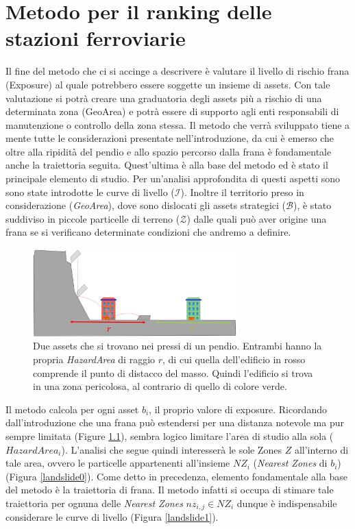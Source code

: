 
\chapter{Metodo per il ranking delle stazioni ferroviarie} %

\label{ch:mathtest} %

Il fine del metodo che ci si accinge a descrivere è valutare il livello di rischio frana (Exposure) al quale potrebbero essere soggette un insieme di assets. Con tale valutazione si potrà creare una graduatoria degli assets più a rischio di una determinata zona (GeoArea) e potrà essere di supporto agli enti responsabili di manutenzione o controllo della zona stessa. Il metodo che verrà sviluppato tiene a mente tutte le considerazioni presentate nell'introduzione, da cui è emerso che oltre alla ripidità del pendio e allo spazio percorso dalla frana è fondamentale anche la traiettoria seguita. Quest'ultima è alla base del metodo ed è stato il principale elemento di studio. Per un'analisi approfondita di questi aspetti sono sono state introdotte le curve di livello ($\mathcal{I}$). Inoltre il territorio preso in considerazione (\textit{GeoArea}), dove sono dislocati gli assets strategici ($\mathcal{B}$), è stato suddiviso in piccole particelle di terreno ($\mathcal{Z}$) dalle quali può aver origine una frana se si verificano determinate condizioni che andremo a definire.


\begin{figure}[h]
	\centering
	\includegraphics[width=0.7\textwidth]{images/raggio_di_azione_frana}
	\caption{Due assets che si trovano nei pressi di un pendio. Entrambi hanno la propria \textit{HazardArea} di raggio $r$, di cui quella dell'edificio in rosso comprende il punto di distacco del masso. Quindi l'edificio si trova in una zona pericolosa, al contrario di quello di colore verde. }
	\label{raggio_azione_frana}
\end{figure}

Il metodo calcola per ogni asset $b_i$, il proprio valore di exposure. Ricordando dall'introduzione che una frana può estendersi per una distanza notevole ma pur sempre limitata (Figure \ref{raggio_azione_frana}), sembra logico limitare l'area di studio alla sola ($HazardArea_i$). L'analisi che segue quindi interesserà le sole Zones $Z$ all'interno di tale area, ovvero le particelle appartenenti all'insieme $NZ_i$ (\textit{Nearest Zones} di $b_i$) (Figura \ref{landslide0}).
Come detto in precedenza, elemento fondamentale alla base del metodo è la  traiettoria di frana. Il metodo infatti si occupa di stimare tale traiettoria per ognuna delle \textit{Nearest Zones} $nz_{i,j} \in NZ_i$ dunque è indispensabile considerare le curve di livello  (Figura \ref{landslide1}). 

